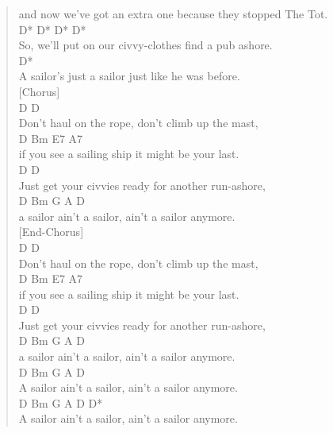 \documentclass[11pt]{article}
\begin{document}
\begin{verse}
and now we've got an extra one because they stopped The Tot.\\
\hspace*{4em}D*    D*                       D*   D*\\
So, we'll put on our civvy-clothes find a pub ashore.\\
\hspace*{2em}D*\\
A sailor's just a sailor just like he was before.\\
\vspace*{1em}
[Chorus]\\
\hspace*{6em}D                       D\\
Don't haul on the rope, don't climb up the mast,\\
D            Bm              E7            A7\\
if you see a sailing ship it might be your last.\\
\hspace*{5em}D                           D\\
Just get your civvies ready for another run-ashore,\\
\hspace*{2em}D              Bm              G      A  D\\
a sailor ain't a sailor, ain't a sailor anymore.\\
\vspace*{1em}
[End-Chorus]\\
\hspace*{6em}D                       D\\
Don't haul on the rope, don't climb up the mast,\\
D            Bm              E7            A7\\
if you see a sailing ship it might be your last.\\
\hspace*{5em}D                           D\\
Just get your civvies ready for another run-ashore,\\
\hspace*{2em}D              Bm              G      A  D\\
a sailor ain't a sailor, ain't a sailor anymore.\\
\hspace*{2em}D              Bm              G      A  D\\
A sailor ain't a sailor, ain't a sailor anymore.\\
\hspace*{2em}D              Bm              G      A  D      D*\\
A sailor ain't a sailor, ain't a sailor anymore.\\
\vspace*{1em}
\end{verse}
\clearpage
\end{document}

